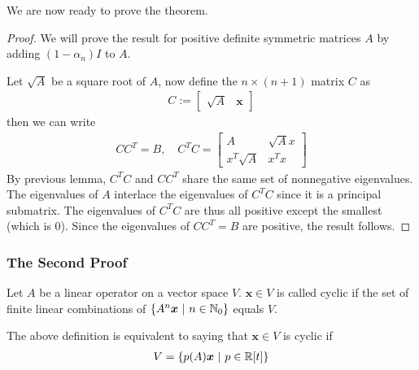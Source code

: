\documentclass{math}
\renewcommand{\vec}[1]{\boldsymbol{#1}}
\begin{document}
We are now ready to prove the theorem.

\begin{proof}
    We will prove the result for positive definite symmetric matrices $A$ by adding $(1 - \alpha_n) I$ to $A$.

    Let $\sqrt{A}$ be a square root of $A$, now define the $n \times (n + 1)$ matrix $C$ as
    \begin{align*}
        C := \begin{bmatrix}
                 \sqrt{A} & \vec{x}
             \end{bmatrix}
    \end{align*}
    then we can write
    \begin{align*}
        CC^T = B, \quad C^T C = \begin{bmatrix}
                                    A            & \sqrt{A}x \\
                                    x^T \sqrt{A} & x^T x
                                \end{bmatrix}
    \end{align*}
    By previous lemma, $C^TC$ and $CC^T$ share the same set of nonnegative eigenvalues. The eigenvalues of $A$ interlace the eigenvalues of $C^T C$ since it is a principal submatrix.
    The eigenvalues of $C^TC$ are thus all positive except the smallest (which is $0$). Since the eigenvalues of $CC^T = B$ are positive, the result follows.
\end{proof}

\subsubsection{The Second Proof}

\begin{definition}
    Let $A$ be a linear operator on a vector space $V$.
    $\vec{x} \in V$ is called cyclic if the set of finite linear combinations of $\setc{A^n\vec{x}}{n \in \mathbb{N}_0}$ equals $V$.
\end{definition}

The above definition is equivalent to saying that $\vec{x} \in V$ is cyclic if
\begin{align*}
    V = \setc{p(A)\vec{x}}{p \in \mathbb{R}[t]}
\end{align*}
\end{document}
